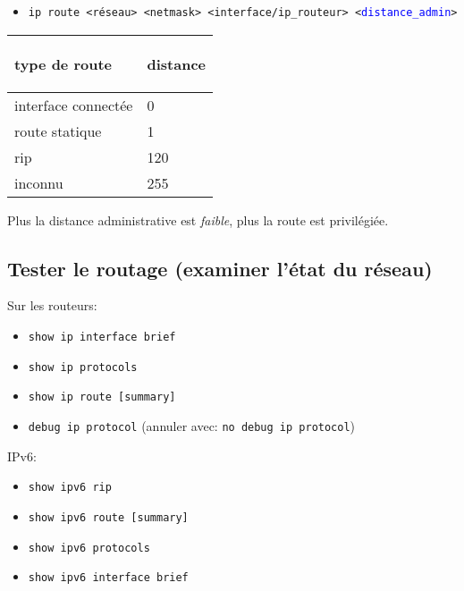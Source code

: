 \documentclass[a4paper]{article}
\begin{document}
\begin{itemize}[label=\textbf{–}]
    \item \texttt{ip route <réseau> <netmask> <interface/ip\_routeur> <\textcolor{blue}{distance\_admin}>}
\end{itemize}
\begin{center}
    \begin{tabular}{|p{4cm}|p{4cm}|} \hline
        \begin{center} \textbf{type de route} \end{center} &
        \begin{center} \textbf{distance} \end{center} \\ \hline
        interface connectée & 0 \\
        route statique & 1 \\
        rip & 120 \\
        inconnu & 255 \\ \hline
    \end{tabular}
\end{center}
Plus la distance administrative est \textit{faible}, plus la route est privilégiée.





\subsection{Tester le routage (examiner l'état du réseau)}



Sur les routeurs:
\begin{itemize}[label=\textbf{–}]
    \item \texttt{show ip interface brief}
    \item \texttt{show ip protocols}
    \item \texttt{show ip route [summary]}
    \item \texttt{debug ip protocol} (annuler avec: \texttt{no debug ip protocol})
\end{itemize}
IPv6:
\begin{itemize}[label=\textbf{–}]
    \item \texttt{show ipv6 rip}
    \item \texttt{show ipv6 route [summary]}
    \item \texttt{show ipv6 protocols}
    \item \texttt{show ipv6 interface brief}
\end{itemize}
\end{document}
